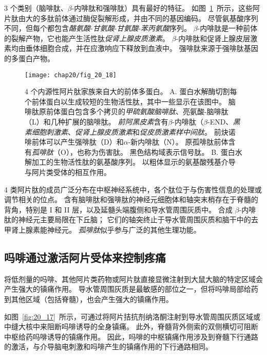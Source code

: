 3 个类别（脑啡肽、$ \beta $-内啡肽和强啡肽）具有最好的特征。
如图~\ref{fig:20_18}~所示，这些阿片肽由大的多肽前体通过酶促裂解形成，并由不同的基因编码。
尽管氨基酸序列不同，但每个都包含\textit{酪氨酸}-\textit{甘氨酸}-\textit{甘氨酸}-\textit{苯丙氨酸}序列。
$ \beta $-内啡肽是一种前体的裂解产物，它也能产生活性肽\textit{促肾上腺皮质激素}。
$ \beta $-内啡肽和促肾上腺皮层激素均由垂体细胞合成，并在应激响应下释放到血液中。
强啡肽来源于强啡肽基因的多蛋白产物。


\begin{figure}[htbp]
	\centering
	\texttt{[image: chap20/fig\_20\_18]}
	\caption{4 个内源性阿片肽家族来自大的前体多蛋白。
		A. 蛋白水解酶切割每个前体蛋白以生成较短的生物活性肽，其中一些显示在该图中。
		脑啡肽原前体蛋白包含多个拷贝的\textit{甲硫氨酸脑啡肽}、亮氨酸-脑啡肽（L）和几种扩展的脑啡肽。
		\textit{前阿黑皮素}含有$\beta$-内啡肽（$\beta$-END、\textit{黑素细胞刺激素}、\textit{促肾上腺皮质激素}和\textit{促皮质激素样中间肽}。
		前炔诺啡前体可以产生强啡肽（D）和$\alpha$-新内啡肽（N）。
		原孤啡肽前体含有\textit{孤啡肽}（O），也称为伤害肽。
		黑色结构域表示信号肽。
		B. 蛋白水解加工的生物活性肽的氨基酸序列。
		以粗体显示的氨基酸残基介导与阿片类受体的相互作用\cite{fields1987painful}。}
	\label{fig:20_18}
\end{figure}


4 类阿片肽的成员广泛分布在中枢神经系统中，各个肽位于与伤害性信息的处理或调节相关的位点。
含有脑啡肽和强啡肽的神经元细胞体和轴突末梢存在于脊髓的背角，特别是 I 和 II 层，以及延髓头端腹侧和导水管周围灰质中。
合成 $\beta$-内啡肽的神经元主要局限在下丘脑；
它们的轴突终止于导水管周围灰质和脑干中的去甲肾上腺素能神经元。
\textit{孤啡肽}似乎参与广泛的其他生理功能。



\subsection{吗啡通过激活阿片受体来控制疼痛}

将低剂量的吗啡、其他阿片类药物或阿片肽直接显微注射到大鼠大脑的特定区域会产生强大的镇痛作用。
导水管周围灰质是最敏感的部位之一，但将吗啡局部给药到其他区域（包括脊髓），也会产生强大的镇痛作用。


如图~\ref{fig:20_17}~所示，可通过将阿片拮抗剂纳洛酮注射到导水管周围灰质区域或中缝大核中来阻断吗啡诱导的全身镇痛。
此外，脊髓背外侧索的双侧横切可阻断中枢给药吗啡诱导的镇痛作用。
因此，吗啡的中枢镇痛作用涉及到脊髓下行通路的激活，与介导脑电刺激和吗啡产生的镇痛作用的下行通路相同。


